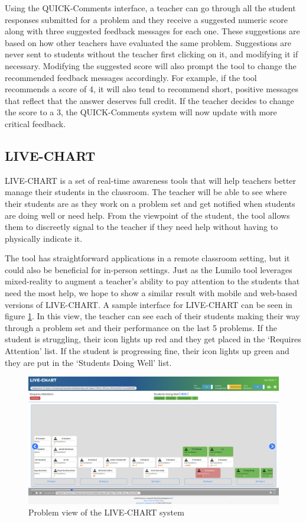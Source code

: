 \documentclass[12pt]{report}
\begin{document}
Using the QUICK-Comments interface, a teacher can go through all the student responses submitted for a problem and they receive a suggested numeric score along with three suggested feedback messages for each one. These suggestions are based on how other teachers have evaluated the same problem. Suggestions are never sent to students without the teacher first clicking on it, and modifying it if necessary. Modifying the suggested score will also prompt the tool to change the recommended feedback messages accordingly. For example, if the tool recommends a score of 4, it will also tend to recommend short, positive messages that reflect that the answer deserves full credit. If the teacher decides to change the score to a 3, the QUICK-Comments system will now update with more critical feedback.

\subsection{LIVE-CHART}

LIVE-CHART is a set of real-time awareness tools that will help teachers better manage their students in the classroom. The teacher will be able to see where their students are as they work on a problem set and get notified when students are doing well or need help. From the viewpoint of the student, the tool allows them to discreetly signal to the teacher if they need help without having to physically indicate it. 

The tool has straightforward applications in a remote classroom setting, but it could also be beneficial for in-person settings. Just as the Lumilo tool \cite{Holstein2018StudentLB} leverages mixed-reality to augment a teacher's ability to pay attention to the students that need the most help, we hope to show a similar result with mobile and web-based versions of LIVE-CHART. A sample interface for LIVE-CHART can be seen in figure \ref{img:live_chart}. In this view, the teacher can see each of their students making their way through a problem set and their performance on the last 5 problems. If the student is struggling, their icon lights up red and they get placed in the `Requires Attention' list. If the student is progressing fine, their icon lights up green and they are put in the `Students Doing Well' list.

\begin{figure}[ht] 
    \centering
    \includegraphics[width=\textwidth]{images/live_chart.png}
    \caption{Problem view of the LIVE-CHART system}
    \label{img:live_chart}
\end{figure}
\end{document}
